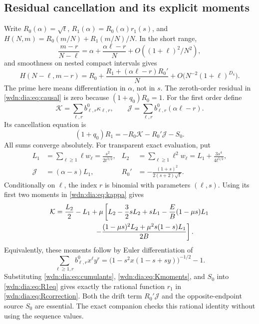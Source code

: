 \documentclass[11pt,letterpaper]{article}
\theoremstyle{remark}\newtheorem{remark}[theorem]{Remark}
\begin{document}
\subsection{Residual cancellation and its explicit moments}
Write $R_0(\alpha)=\sqrt t$, $R_1(\alpha)=R_0(\alpha)r_1(s)$, and
$H(N,m)=R_0(m/N)+R_1(m/N)/N$. In the short range,
\[
 \frac{m-r}{N-\ell}=\alpha+\frac{\alpha\ell-r}{N}
                    +O((1+\ell)^2/N^2),
\]
and smoothness on nested compact intervals gives
\begin{equation}\label{wdn:dia:eq:Hshift}
 H(N-\ell,m-r)=R_0+\frac{R_1+(\alpha\ell-r)R_0'}N
              +O\bigl(N^{-2}(1+\ell)^{D_4}\bigr).
\end{equation}
The prime here means differentiation in $\alpha$, not in $s$.
The zeroth-order residual in \eqref{wdn:dia:eq:causal} is zero because
$(1+q_0)R_0=1$. For the first order define
\[
 \mathcal K=\sum_{\ell,r}b^0_{\ell,r}\kappa_{\ell,r},\qquad
 \mathcal J=\sum_{\ell,r}b^0_{\ell,r}(\alpha\ell-r).
\]
Its cancellation equation is
\begin{equation}\label{wdn:dia:eq:R1eq}
 (1+q_0)R_1=-R_0\mathcal K-R_0'\mathcal J-S_0.
\end{equation}
All sums converge absolutely. For transparent exact evaluation, put
\begin{align*}
 L_1&=\sum_{\ell\ge1}\ell w_\ell=\frac{s^2}{2t^{3/2}},&
 L_2&=\sum_{\ell\ge1}\ell^2w_\ell=L_1+\frac{3s^4}{4t^{5/2}},\\
 \mathcal J&=(\alpha-s)L_1,&
 R_0'&=-\frac{(1+s)^2}{2(s+2)\sqrt t}.
\end{align*}
Conditionally on $\ell$, the index $r$ is binomial with parameters $(\ell,s)$.
Using its first two moments in \eqref{wdn:dia:eq:kappa} gives
\begin{align}\label{wdn:dia:eq:Kmoments}
 \mathcal K={}&\frac{L_2}2-L_1+
 \mu\left[L_2-\frac32sL_2+sL_1-\frac EB(1-\mu s)L_1\right.\notag\\
 &\left.\hspace{15mm}
 -\frac{(1-\mu s)^2L_2+\mu^2s(1-s)L_1}{2B}\right].
\end{align}
Equivalently, these moments follow by Euler differentiation of
\[
 \sum_{\ell\ge1,r}b^0_{\ell,r}x^\ell y^r
 =\bigl(1-s^2x(1-s+sy)\bigr)^{-1/2}-1.
\]
Substituting \eqref{wdn:dia:eq:cumulants}, \eqref{wdn:dia:eq:Kmoments}, and $S_0$ into
\eqref{wdn:dia:eq:R1eq} gives exactly the rational function $r_1$ in
\eqref{wdn:dia:eq:Rcorrection}. Both the drift term $R_0'\mathcal J$ and the
opposite-endpoint source $S_0$ are essential. The exact companion checks
this rational identity without using the sequence values.
\end{document}
